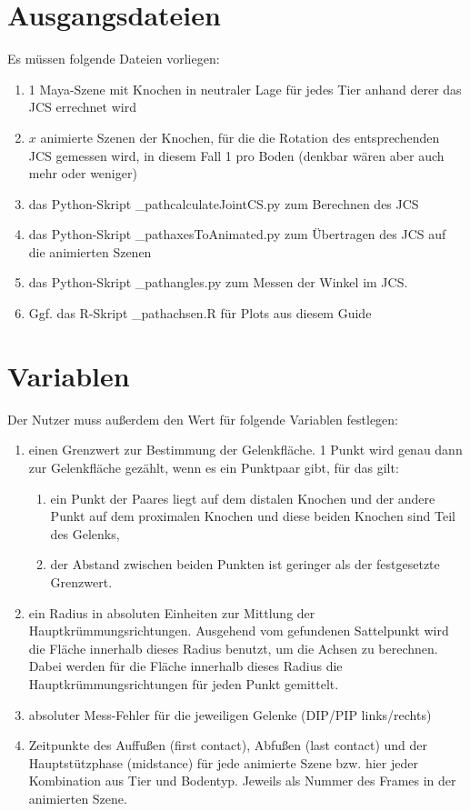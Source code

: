 \documentclass[a4paper, openany, oneside]{memoir}
\begin{document}
\section{Ausgangsdateien}
Es müssen folgende Dateien vorliegen:
\begin{enumerate}
\item 1 Maya-Szene mit Knochen in neutraler Lage für jedes Tier anhand derer das JCS errechnet wird
\item \(x\) animierte Szenen der Knochen, für die die Rotation des entsprechenden JCS gemessen wird, in diesem Fall 1 pro Boden (denkbar wären aber auch mehr oder weniger) 
\item das Python-Skript \File_path{calculateJointCS.py} zum Berechnen des JCS
\item das Python-Skript \File_path{axesToAnimated.py} zum Übertragen des JCS auf die animierten Szenen
\item das Python-Skript \File_path{angles.py} zum Messen der Winkel im JCS.
\item Ggf. das R-Skript \File_path{achsen.R} für Plots aus diesem Guide
\end{enumerate}

\section{Variablen}\label{sec_variables}
Der Nutzer muss außerdem den Wert für folgende Variablen festlegen:
\begin{enumerate}
\item einen Grenzwert zur Bestimmung der Gelenkfläche.\label{th_def} 1 Punkt wird genau dann zur Gelenkfläche gezählt, wenn es ein Punktpaar gibt, für das gilt:
\begin{enumerate}
\item ein Punkt der Paares liegt auf dem distalen Knochen und der andere Punkt auf dem proximalen Knochen und diese beiden Knochen sind Teil des Gelenks,
\item der Abstand zwischen beiden Punkten ist geringer als der festgesetzte Grenzwert.
\end{enumerate}  
\item ein Radius in absoluten Einheiten zur Mittlung der Hauptkrümmungsrichtungen. Ausgehend vom gefundenen Sattelpunkt wird die Fläche innerhalb dieses Radius benutzt, um die Achsen zu berechnen. Dabei werden für die Fläche innerhalb dieses Radius die Hauptkrümmungsrichtungen für jeden Punkt gemittelt. \label{radius_def}
\item absoluter Mess-Fehler für die jeweiligen Gelenke (DIP/PIP links/rechts) \label{error_def}
\item Zeitpunkte des Auffußen (first contact), Abfußen (last contact) und der Hauptstützphase (midstance) für jede animierte Szene bzw. hier jeder Kombination aus Tier und Bodentyp. Jeweils als Nummer des Frames in der animierten Szene. \label{stance_def} 
\end{enumerate}
\end{document}
